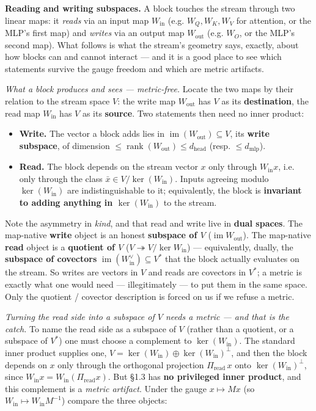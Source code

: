 \textbf{Reading and writing subspaces.} A block touches the stream through two linear maps: it \emph{reads} via an input map $W_{\text{in}}$ (e.g. $W_Q, W_K, W_V$ for attention, or the MLP's first map) and \emph{writes} via an output map $W_{\text{out}}$ (e.g. $W_O$, or the MLP's second map). What follows is what the stream's geometry says, exactly, about how blocks can and cannot interact --- and it is a good place to see which statements survive the gauge freedom and which are metric artifacts.


\emph{What a block produces and sees --- metric-free.} Locate the two maps by their relation to the stream space $V$: the write map $W_{\text{out}}$ has $V$ as its \textbf{destination}, the read map $W_{\text{in}}$ has $V$ as its \textbf{source}. Two statements then need no inner product:

\begin{itemize}
\item \textbf{Write.} The vector a block adds lies in $\operatorname{im}(W_{\text{out}}) \subseteq V$, its \textbf{write subspace}, of dimension $\le \operatorname{rank}(W_{\text{out}}) \le d_{\text{head}}$ (resp. $\le d_{\text{mlp}}$).
\item \textbf{Read.} The block depends on the stream vector $x$ only through $W_{\text{in}}x$, i.e. only through the class $\bar x \in V/\ker(W_{\text{in}})$. Inputs agreeing modulo $\ker(W_{\text{in}})$ are indistinguishable to it; equivalently, the block is \textbf{invariant to adding anything in $\ker(W_{\text{in}})$} to the stream.
\end{itemize}

Note the asymmetry in \emph{kind}, and that read and write live in \textbf{dual spaces}. The map-native \textbf{write} object is an honest \textbf{subspace of $V$} ($\operatorname{im}W_{\text{out}}$). The map-native \textbf{read} object is a \textbf{quotient of $V$} ($V \twoheadrightarrow V/\ker W_{\text{in}}$) --- equivalently, dually, the \textbf{subspace of covectors} $\operatorname{im}(W_{\text{in}}^{\vee}) \subseteq V^{*}$ that the block actually evaluates on the stream. So writes are vectors in $V$ and reads are covectors in $V^{*}$; a metric is exactly what one would need --- illegitimately --- to put them in the same space. Only the quotient / covector description is forced on us if we refuse a metric.


\emph{Turning the read side into a subspace of $V$ needs a metric --- and that is the catch.} To name the read side as a subspace of $V$ (rather than a quotient, or a subspace of $V^{*}$) one must choose a complement to $\ker(W_{\text{in}})$. The standard inner product supplies one, $V = \ker(W_{\text{in}}) \oplus \ker(W_{\text{in}})^{\perp}$, and then the block depends on $x$ only through the orthogonal projection $\Pi_{\text{read}}\,x$ onto $\ker(W_{\text{in}})^{\perp}$, since $W_{\text{in}}x = W_{\text{in}}(\Pi_{\text{read}}x)$. But §1.3 has \textbf{no privileged inner product}, and this complement is a \emph{metric artifact}. Under the gauge $x \mapsto Mx$ (so $W_{\text{in}}\mapsto W_{\text{in}}M^{-1}$) compare the three objects:

